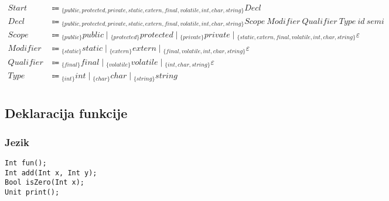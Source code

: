 \documentclass{report}
\newcommand{\Null}{\varepsilon}
\newcommand{\Spc}{\ }
\newcommand{\Union}{\mathrel{|}}
\newcommand{\Arrow}{\Coloneq}
\newcommand{\NT}[1]{{#1}}
\newcommand{\T}[1]{{#1}}
\newcommand{\Lookahead}[1]{{}_{\{{#1}\}}}
\begin{document}
\begin{equation*}
  \begin{aligned}
    \NT{Start} &\Arrow \Lookahead{\T{public}, \T{protected}, \T{private}, \T{static}, \T{extern}, \T{final}, \T{volatile}, \T{int}, \T{char}, \T{string}} \NT{Decl}\\
    \NT{Decl} &\Arrow \Lookahead{\T{public}, \T{protected}, \T{private}, \T{static}, \T{extern}, \T{final}, \T{volatile}, \T{int}, \T{char}, \T{string}} \NT{Scope} \Spc \NT{Modifier} \Spc \NT{Qualifier} \Spc \NT{Type} \Spc \T{id} \Spc \T{semi}\\
    \NT{Scope} &\Arrow \Lookahead{\T{public}} \T{public} \Union \Lookahead{\T{protected}} \T{protected} \Union \Lookahead{\T{private}} \T{private} \Union \Lookahead{\T{static}, \T{extern}, \T{final}, \T{volatile}, \T{int}, \T{char}, \T{string}} \Null\\
    \NT{Modifier} &\Arrow \Lookahead{\T{static}} \T{static} \Union \Lookahead{\T{extern}} \T{extern} \Union \Lookahead{\T{final}, \T{volatile}, \T{int}, \T{char}, \T{string}} \Null\\
    \NT{Qualifier} &\Arrow \Lookahead{\T{final}} \T{final} \Union \Lookahead{\T{volatile}} \T{volatile} \Union \Lookahead{\T{int}, \T{char}, \T{string}} \Null\\
    \NT{Type} &\Arrow \Lookahead{\T{int}}  \T{int} \Union \Lookahead{\T{char}} \T{char} \Union \Lookahead{\T{string}} \T{string}\\
  \end{aligned}
\end{equation*}

\subsection{Deklaracija funkcije}

\subsubsection*{Jezik}
\begin{verbatim}
Int fun();
Int add(Int x, Int y);
Bool isZero(Int x);
Unit print();
\end{verbatim}
\end{document}
